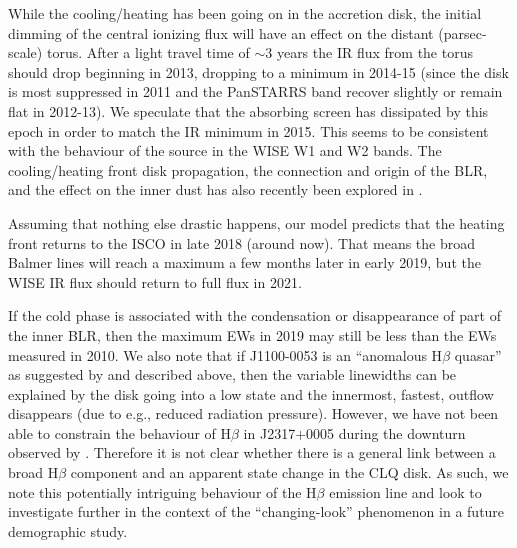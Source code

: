 \documentclass[a4paper,fleqn,usenatbib]{mnras}
\begin{document}
While the cooling/heating has been going on in the accretion disk, the
initial dimming of the central ionizing flux will have an effect on
the distant (parsec-scale) torus. After a light travel time of $\sim
3$ years the IR flux from the torus should drop \citep{Koshida2014,
Jun2015b} beginning in 2013, dropping to a minimum in 2014-15 (since
the disk is most suppressed in 2011 and the PanSTARRS band recover
slightly or remain flat in 2012-13). We speculate that the absorbing
screen has dissipated by this epoch in order to match the IR minimum
in 2015. This seems to be consistent with the behaviour of the source
in the WISE W1 and W2 bands. The cooling/heating front disk
propagation, the connection and origin of the BLR, and the effect on
the inner dust has also recently been explored in
\citet{Baskin_Laor2018}.

Assuming that nothing else drastic happens, our model predicts that
the heating front returns to the ISCO in late 2018 (around now). That
means the broad Balmer lines will reach a maximum a few months later
in early 2019, but the WISE IR flux should return to full flux in
2021. 

If the cold phase is associated with the condensation or disappearance
of part of the inner BLR, then the maximum EWs in 2019 may still be
less than the EWs measured in 2010. We also note that if J1100-0053 is
an ``anomalous H$\beta$ quasar'' as suggested by
\citet{Steinhardt_Silverman2013} and described above, then the
variable linewidths can be explained by the disk going into a low
state and the innermost, fastest, outflow disappears (due to e.g.,
reduced radiation pressure). 
However, we have not been able to constrain the behaviour of H$\beta$ in J2317+0005 during the downturn observed by \citep{Guo_2016}. Therefore it is not clear whether there is a general link between a broad H$\beta$ component and an apparent state change in the CLQ disk.  
As such, we note this potentially intriguing
behaviour of the H$\beta$ emission line and look to investigate
further in the context of the ``changing-look'' phenomenon in a future
demographic study.
\end{document}
